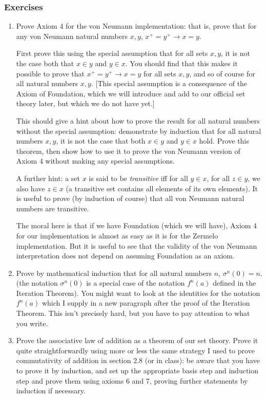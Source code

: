 \documentclass[12pt]{book}
\begin{document}
\subsubsection{Exercises}

\begin{enumerate}

\item Prove Axiom 4 for the von Neumann implementation:  that is, prove that for any von Neumann  natural numbers $x,y$, $x^+ = y^+ \rightarrow x=y$.

First prove this using the special assumption that for all sets $x,y$, it is not the case both that $x \in y$ and $y \in x$.  You should find that this makes it possible to prove
that $x^+ = y^+ \rightarrow x=y$ for all sets $x,y$, and so of course for all natural numbers $x,y$.   [This special assumption is a consequence of the Axiom of Foundation, which we will introduce and add to our official set theory later, but which we do not have yet.]

This should give a hint about how to prove the result for all natural numbers without the special assumption:  demonstrate by induction that for all natural numbers $x,y$, it is not the case that both $x \in y$ and $y \in x$ hold.  Prove this theorem, then show how to use it to prove the von Neumann version of Axiom 4 without making any special assumptions.

A further hint:  a set $x$ is said to be {\em transitive\/}  iff for all $y \in x$, for all $z \in y$, we also have $z \in x$ (a transitive set contains all elements of its own elements).  It is useful to prove (by induction of course) that all von Neumann natural numbers are transitive.

The moral here is that if we have Foundation (which we will have), Axiom 4 for our implementation is almost as easy as it is for the Zermelo implementation.  But it is useful to see that the validity of the von Neumann interpretation does not depend on assuming Foundation as an axiom.

\item  Prove by mathematical induction that for all natural numbers $n$, $\sigma^n(0)=n$.  (the notation $\sigma^n(0)$ is a special case of the notation $f^n(a)$ defined in the Iteration Theorem).  You might want to look at the identities for the notation $f^n(a)$ which I supply in a new paragraph after the proof of the Iteration Theorem.  This isn't precisely hard, but you have to pay attention to what you write.

\item Prove the associative law of addition as a theorem of our set theory.  Prove it quite straightforwardly using more or less the same strategy I used to prove commutativity of addition in section 2.8 (or in class):  be aware that you have to prove it by induction, and set up the appropriate basis step and induction step and prove them using axioms 6 and 7, proving further statements by induction if necessary.


\end{enumerate}
\end{document}
